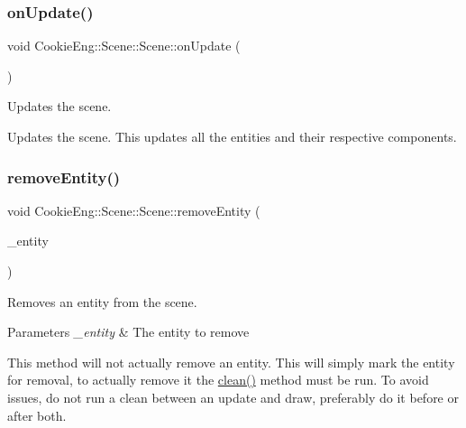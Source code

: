 \subsubsection{\texorpdfstring{on\+Update()}{onUpdate()}}
{\footnotesize\ttfamily void Cookie\+Eng\+::\+Scene\+::\+Scene\+::on\+Update (\begin{DoxyParamCaption}{ }\end{DoxyParamCaption})}



Updates the scene. 

Updates the scene. This updates all the entities and their respective components. \mbox{\label{class_cookie_eng_1_1_scene_1_1_scene_aefa43f3ce579fe9798870c95d92711db}} 
\subsubsection{\texorpdfstring{remove\+Entity()}{removeEntity()}}
{\footnotesize\ttfamily void Cookie\+Eng\+::\+Scene\+::\+Scene\+::remove\+Entity (\begin{DoxyParamCaption}\item[{std\+::shared\+\_\+ptr$<$ \hyperlink{class_cookie_eng_1_1_e_c_s_1_1_entity}{E\+C\+S\+::\+Entity} $>$}]{\+\_\+entity }\end{DoxyParamCaption})}



Removes an entity from the scene. 


\begin{DoxyParams}{Parameters}
{\em \+\_\+entity} & The entity to remove\\
\hline
\end{DoxyParams}
This method will not actually remove an entity. This will simply mark the entity for removal, to actually remove it the \hyperlink{class_cookie_eng_1_1_scene_1_1_scene_a3e1fa17bfd8e0e3af72db05c7a5ae0b3}{clean()} method must be run. To avoid issues, do not run a clean between an update and draw, preferably do it before or after both. \mbox{\label{class_cookie_eng_1_1_scene_1_1_scene_adca281b1bff287a62391b5bb8bc18f5c}} 
